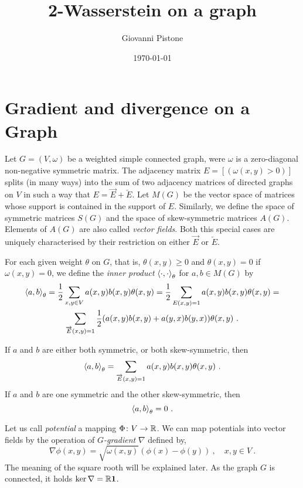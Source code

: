 \documentclass[12pt,a4paper]{amsart}
\title{2-Wasserstein on a graph}
\author{Giovanni Pistone}
\date{\today}
\begin{document}
\maketitle

\section{Gradient and divergence on a Graph}

Let $G = (V,\omega)$ be a weighted simple connected graph, were
$\omega$ is a zero-diagonal non-negative symmetric matrix. The
adjacency matrix $E = [(\omega(x,y) > 0)]$ splits (in many ways) into
the sum of two adjacency matrices of directed graphs on $V$ in such a
way that $E = \overrightarrow E + \overleftarrow E$. Let $M(G)$ be the
vector space of matrices whose support is contained in the support of
$E$. Similarly, we define the space of symmetric matrices $S(G)$ and
the space of skew-symmetric matrices $A(G)$. Elements of $A(G)$ are
also called \emph{vector fields}. Both this special cases are uniquely
characterised by their restriction on either $\overrightarrow E$ or
$\overleftarrow E$.

For each given weight $\theta$ on $G$, that is, $\theta(x,y) \geq 0$
and $\theta(x,y) = 0$ if $\omega(x,y) = 0$, we define the \emph{inner
  product} $\left\langle\cdot,\cdot\right\rangle_{\theta}$ for $a,b \in M(G)$ by
\begin{multline*}
  \left\langle a,b\right\rangle_{\theta} = \frac 12 \sum _ {x,y \in V} a(x,y)
  b(x,y)\theta(x,y) = \frac 12 \sum _ {E(x,y)=1} a(x,y)
  b(x,y)\theta(x,y) = \\ \sum_{\overrightarrow E(x,y)=1}
  \frac12(a(x,y)b(x,y)+a(y,x)b(y,x)) \theta(x,y)\ .
\end{multline*}

If $a$ and $b$ are either both symmetric, or both skew-symmetric, then
\begin{equation*}
  \left\langle a,b\right\rangle_{\theta} = \sum_{\overrightarrow E(x,y)=1}
  a(x,y)b(x,y) \theta(x,y) \ .
\end{equation*}
If $a$ and $b$ are one symmetric and the other skew-symmetric, then
\begin{equation*}
  \left\langle a,b\right\rangle_{\theta} = 0 \ .
\end{equation*}

Let us call \emph{potential} a mapping $\Phi \colon V \to \mathbb{R}$. We
can map potentials into vector fields by the operation of
\emph{$G$-gradient} $\nabla$ defined by,
\begin{equation*}
  \nabla \phi(x,y) = \sqrt {\omega(x,y)} (\phi(x) - \phi(y)) \ , \quad
  x,y \in V \ .
\end{equation*}
The meaning of the square rooth will be explained later. As the graph
$G$ is connected, it holds $\ker \nabla = \mathbb{R} \bm 1$.
\end{document}
